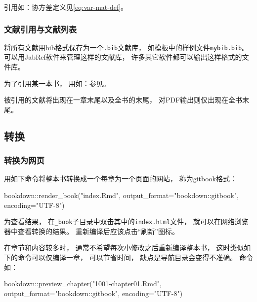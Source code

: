 \documentclass[
]{article}
\newenvironment{Shaded}{\begin{snugshade}}{\end{snugshade}}
\newcommand{\AttributeTok}[1]{\textcolor[rgb]{0.77,0.63,0.00}{#1}}
\newcommand{\FunctionTok}[1]{\textcolor[rgb]{0.00,0.00,0.00}{#1}}
\newcommand{\NormalTok}[1]{#1}
\newcommand{\SpecialCharTok}[1]{\textcolor[rgb]{0.00,0.00,0.00}{#1}}
\newcommand{\StringTok}[1]{\textcolor[rgb]{0.31,0.60,0.02}{#1}}
\begin{document}
引用如：协方差定义见\eqref{eq:var-mat-def}。

\hypertarget{ux6587ux732eux5f15ux7528ux4e0eux6587ux732eux5217ux8868}{%
\subsubsection{文献引用与文献列表}\label{ux6587ux732eux5f15ux7528ux4e0eux6587ux732eux5217ux8868}}

将所有文献用bib格式保存为一个\texttt{.bib}文献库，
如模板中的样例文件\texttt{mybib.bib}。
可以用JabRef软件来管理这样的文献库，
许多其它软件都可以输出这样格式的文件库。

为了引用某一本书，
用如：参见\autocite{Wichmann1982:RNG}。

被引用的文献将出现在一章末尾以及全书的末尾，
对PDF输出则仅出现在全书末尾。

\hypertarget{usage-output}{%
\subsection{转换}\label{usage-output}}

\hypertarget{usage-gitbook}{%
\subsubsection{转换为网页}\label{usage-gitbook}}

用如下命令将整本书转换成一个每章为一个页面的网站，
称为gitbook格式：

\begin{Shaded}
\begin{Highlighting}[]
\NormalTok{bookdown}\SpecialCharTok{::}\FunctionTok{render\_book}\NormalTok{(}\StringTok{"index.Rmd"}\NormalTok{, }
  \AttributeTok{output\_format=}\StringTok{"bookdown::gitbook"}\NormalTok{, }\AttributeTok{encoding=}\StringTok{"UTF{-}8"}\NormalTok{)}
\end{Highlighting}
\end{Shaded}

为查看结果，
在\texttt{\_book}子目录中双击其中的\texttt{index.html}文件，
就可以在网络浏览器中查看转换的结果。
重新编译后应该点击``刷新''图标。

在章节和内容较多时，
通常不希望每次小修改之后重新编译整本书，
这时类似如下的命令可以仅编译一章，
可以节省时间，
缺点是导航目录会变得不准确。
命令如：

\begin{Shaded}
\begin{Highlighting}[]
\NormalTok{bookdown}\SpecialCharTok{::}\FunctionTok{preview\_chapter}\NormalTok{(}\StringTok{"1001{-}chapter01.Rmd"}\NormalTok{,}
  \AttributeTok{output\_format=}\StringTok{"bookdown::gitbook"}\NormalTok{, }\AttributeTok{encoding=}\StringTok{"UTF{-}8"}\NormalTok{)}
\end{Highlighting}
\end{Shaded}
\end{document}
